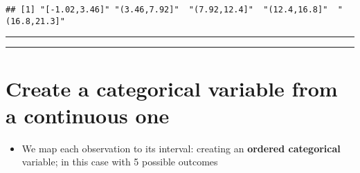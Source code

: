 \documentclass[
]{book}
\providecommand{\tightlist}{%
  \setlength{\itemsep}{0pt}\setlength{\parskip}{0pt}}
\begin{document}
\begin{verbatim}
## [1] "[-1.02,3.46]" "(3.46,7.92]"  "(7.92,12.4]"  "(12.4,16.8]"  "(16.8,21.3]"
\end{verbatim}

\begin{center}\rule{0.5\linewidth}{0.5pt}\end{center}

\begin{center}\rule{0.5\linewidth}{0.5pt}\end{center}

\hypertarget{create-a-categorical-variable-from-a-continuous-one}{%
\section{Create a categorical variable from a continuous one}\label{create-a-categorical-variable-from-a-continuous-one}}

\begin{itemize}
\tightlist
\item
  We map each observation to its interval: creating an \textbf{ordered categorical} variable; in this case with 5 possible outcomes
\end{itemize}
\end{document}
